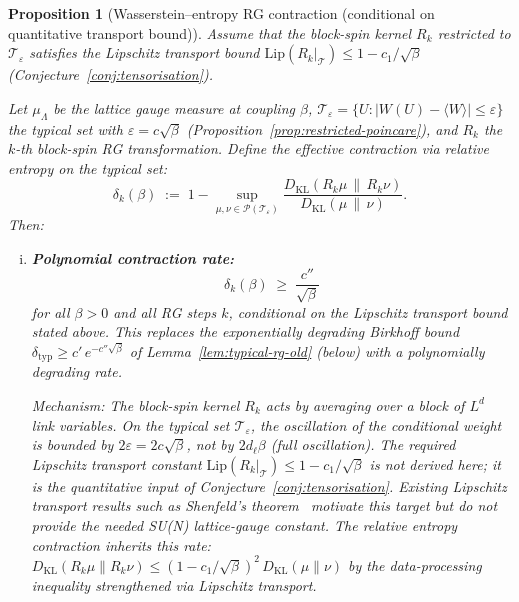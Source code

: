 \documentclass[12pt,a4paper]{article}
\theoremstyle{definition}
\theoremstyle{plain}
\newtheorem{proposition}[definition]{Proposition}
\theoremstyle{remark}
\begin{document}
\begin{proposition}[Wasserstein--entropy RG contraction (conditional on quantitative transport bound)]\label{prop:wasserstein-rg}
Assume that the block-spin kernel $R_k$ restricted to $\mathcal{T}_\varepsilon$ satisfies the Lipschitz transport bound $\mathrm{Lip}(R_k|_{\mathcal{T}}) \leq 1 - c_1/\sqrt{\beta}$ (Conjecture~\ref{conj:tensorisation}).

\medskip
\noindent
Let $\mu_\Lambda$ be the lattice gauge measure at coupling $\beta$,
$\mathcal{T}_\varepsilon = \{U : |W(U) - \langle W\rangle| \leq \varepsilon\}$
the typical set with $\varepsilon = c\sqrt{\beta}$
(Proposition~\ref{prop:restricted-poincare}),
and $R_k$ the $k$-th block-spin RG transformation.
Define the \emph{effective contraction} via relative entropy on the typical set:
\begin{equation}\label{eq:wasserstein-contraction}
  \delta_k(\beta) \;:=\; 1 - \sup_{\mu,\nu \in \mathcal{P}(\mathcal{T}_\varepsilon)}
  \frac{D_{\mathrm{KL}}(R_k\mu \,\|\, R_k\nu)}{D_{\mathrm{KL}}(\mu \,\|\, \nu)}.
\end{equation}
Then:
\begin{enumerate}[(i)]
\item \textbf{Polynomial contraction rate:}
  \begin{equation}\label{eq:polynomial-rate}
    \delta_k(\beta) \;\geq\; \frac{c''}{\sqrt{\beta}}
  \end{equation}
  for all $\beta > 0$ and all RG steps $k$, conditional on the Lipschitz transport bound stated above.
  This replaces the exponentially degrading Birkhoff bound
  $\delta_{\mathrm{typ}} \geq c'\,e^{-c''\sqrt{\beta}}$
  of Lemma~\ref{lem:typical-rg-old} (below) with a \emph{polynomially}
  degrading rate.

  \emph{Mechanism:} The block-spin kernel $R_k$ acts by averaging over
  a block of $L^d$ link variables.  On the typical set $\mathcal{T}_\varepsilon$,
  the oscillation of the conditional weight is bounded by $2\varepsilon = 2c\sqrt{\beta}$,
  not by $2 d_\ell \beta$ (full oscillation).
  The required Lipschitz transport constant
  $\mathrm{Lip}(R_k|_{\mathcal{T}}) \leq 1 - c_1/\sqrt{\beta}$
  is not derived here; it is the quantitative input of
  Conjecture~\ref{conj:tensorisation}. Existing Lipschitz transport
  results such as Shenfeld's theorem~\cite{Shenfeld2024} motivate this
  target but do not provide the needed SU(N) lattice-gauge constant.
  The relative entropy contraction inherits this rate:
  $D_{\mathrm{KL}}(R_k\mu \| R_k\nu) \leq (1 - c_1/\sqrt{\beta})^2 \,D_{\mathrm{KL}}(\mu\|\nu)$
  by the data-processing inequality strengthened via Lipschitz transport.


\end{enumerate}
\end{proposition}
\end{document}
